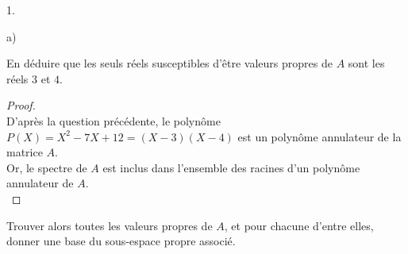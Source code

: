 \documentclass[11pt]{article}%
\begin{document}
\begin{noliste}{1.}
\begin{noliste}{a)}
  \item En déduire que les seuls réels susceptibles d'être valeurs
    propres de $A$ sont les réels $3$ et $4$.

    \begin{proof}~\\%
      D'après la question précédente, le polynôme $P(X) = X^2 - 7X +
      12 = (X-3)(X-4)$ est un polynôme annulateur de la matrice
      $A$.\\
      Or, le spectre de $A$ est inclus dans l'ensemble des racines
      d'un polynôme annulateur de $A$.%
      ~\\[-1.4cm]
    \end{proof}




  \item Trouver alors toutes les valeurs propres de $A$, et pour
    chacune d'entre elles, donner une base du sous-espace propre
    associé.


\end{noliste}
\end{noliste}
\end{document}
